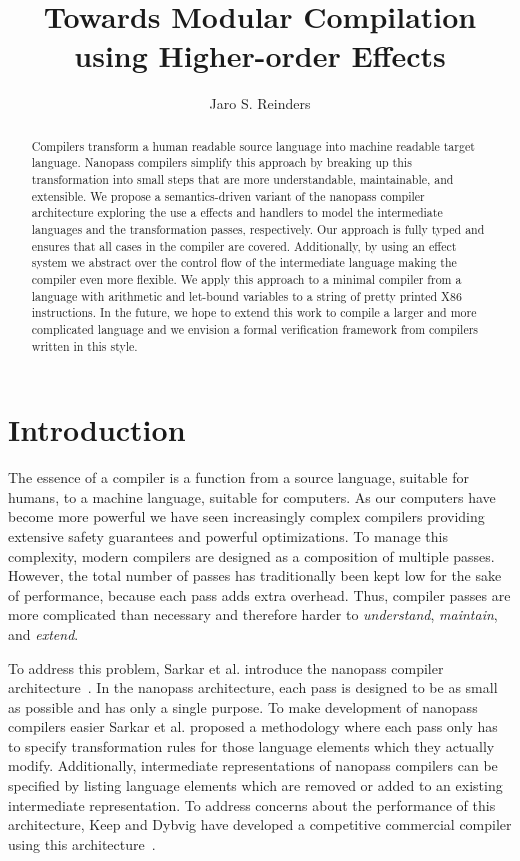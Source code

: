 \documentclass[a4paper,UKenglish,cleveref, autoref, thm-restate]{oasics-v2021}
\title{Towards Modular Compilation using Higher-order Effects}
\author{Jaro S. Reinders}{Delft University of Technology, Netherlands}{j.s.reinders@tudelft.nl}{https://orcid.org/0000-0002-6837-3757}{} %
\begin{document}
\maketitle

\begin{abstract}
  Compilers transform a human readable source language into machine readable target language.
  Nanopass compilers simplify this approach by breaking up this transformation into small steps that are more understandable, maintainable, and extensible.
  We propose a semantics-driven variant of the nanopass compiler architecture exploring the use a effects and handlers to model the intermediate languages and the transformation passes, respectively.
  Our approach is fully typed and ensures that all cases in the compiler are covered.
  Additionally, by using an effect system we abstract over the control flow of the intermediate language making the compiler even more flexible.
  We apply this approach to a minimal compiler from a language with arithmetic and let-bound variables to a string of pretty printed X86 instructions.
  In the future, we hope to extend this work to compile a larger and more complicated language and we envision a formal verification framework from compilers written in this style.
\end{abstract}

\section{Introduction}

The essence of a compiler is a function from a source language, suitable for humans, to a machine language, suitable for computers.
As our computers have become more powerful we have seen increasingly complex compilers providing extensive safety guarantees and powerful optimizations.
To manage this complexity, modern compilers are designed as a composition of multiple passes.
However, the total number of passes has traditionally been kept low for the sake of performance, because each pass adds extra overhead.
Thus, compiler passes are more complicated than necessary and therefore harder to \emph{understand}, \emph{maintain}, and \emph{extend}.

To address this problem, Sarkar et al. introduce the nanopass compiler architecture~\cite{10.1145/1016850.1016878}.
In the nanopass architecture, each pass is designed to be as small as possible and has only a single purpose.
To make development of nanopass compilers easier Sarkar et al. proposed a methodology where each pass only has to specify transformation rules for those language elements which they actually modify.
Additionally, intermediate representations of nanopass compilers can be specified by listing language elements which are removed or added to an existing intermediate representation.
To address concerns about the performance of this architecture, Keep and Dybvig have developed a competitive commercial compiler using this architecture~\cite{10.1145/2544174.2500618}.
\end{document}
